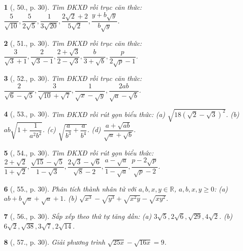 \documentclass{article}
\newtheorem{baitoan}{}%
\begin{document}
\begin{baitoan}[\cite{SGK_Toan_9_tap_1}, 50., p. 30]
	Tìm ĐKXĐ rồi trục căn thức: $\dfrac{5}{\sqrt{10}},\dfrac{5}{2\sqrt{5}},\dfrac{1}{3\sqrt{20}},\dfrac{2\sqrt{2} + 2}{5\sqrt{2}},\dfrac{y + b\sqrt{y}}{b\sqrt{y}}$.
\end{baitoan}

\begin{baitoan}[\cite{SGK_Toan_9_tap_1}, 51., p. 30]
	Tìm ĐKXĐ rồi trục căn thức: $\dfrac{3}{\sqrt{3} + 1},\dfrac{2}{\sqrt{3} - 1},\dfrac{2 + \sqrt{3}}{2 - \sqrt{3}},\dfrac{b}{3 + \sqrt{b}},\dfrac{p}{2\sqrt{p} - 1}$.
\end{baitoan}

\begin{baitoan}[\cite{SGK_Toan_9_tap_1}, 52., p. 30]
	Tìm ĐKXĐ rồi trục căn thức: $\dfrac{2}{\sqrt{6} - \sqrt{5}},\dfrac{3}{\sqrt{10} + \sqrt{7}},\dfrac{1}{\sqrt{x} - \sqrt{y}},\dfrac{2ab}{\sqrt{a} - \sqrt{b}}$.
\end{baitoan}

\begin{baitoan}[\cite{SGK_Toan_9_tap_1}, 53., p. 30]
	Tìm ĐKXĐ rồi rút gọn biểu thức: (a) $\sqrt{18(\sqrt{2} - \sqrt{3})^2}$. (b) $ab\sqrt{1 + \dfrac{1}{a^2b^2}}$. (c) $\sqrt{\dfrac{a}{b^3} + \dfrac{a}{b^4}}$. (d) $\dfrac{a + \sqrt{ab}}{\sqrt{a} + \sqrt{b}}$.
\end{baitoan}

\begin{baitoan}[\cite{SGK_Toan_9_tap_1}, 54., p. 30]
	Tìm ĐKXĐ rồi rút gọn biểu thức: $\dfrac{2 + \sqrt{2}}{1 + \sqrt{2}},\dfrac{\sqrt{15} - \sqrt{5}}{1 - \sqrt{3}},\dfrac{2\sqrt{3} - \sqrt{6}}{\sqrt{8} - 2},\dfrac{a - \sqrt{a}}{1 - \sqrt{a}},\dfrac{p - 2\sqrt{p}}{\sqrt{p} - 2}$.
\end{baitoan}

\begin{baitoan}[\cite{SGK_Toan_9_tap_1}, 55., p. 30]
	Phân tích thành nhân tử với $a,b,x,y\in\mathbb{R}$, $a,b,x,y\ge0$: (a) $ab + b\sqrt{a} + \sqrt{a} + 1$. (b) $\sqrt{x^3} - \sqrt{y^3} + \sqrt{x^2y} - \sqrt{xy^2}$.
\end{baitoan}

\begin{baitoan}[\cite{SGK_Toan_9_tap_1}, 56., p. 30]
	Sắp xếp theo thứ tự tăng dần: (a) $3\sqrt{5},2\sqrt{6},\sqrt{29},4\sqrt{2}$. (b) $6\sqrt{2},\sqrt{38},3\sqrt{7},2\sqrt{14}$.
\end{baitoan}

\begin{baitoan}[\cite{SGK_Toan_9_tap_1}, 57., p. 30]
	Giải phương trình $\sqrt{25x} - \sqrt{16x} = 9$.
\end{baitoan}
\end{document}
